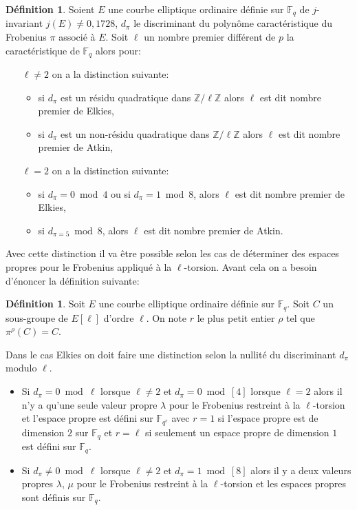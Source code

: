 \documentclass[10pt,a4paper]{book}
\theoremstyle{plain}
\theoremstyle{definition}
\theoremstyle{definition}
\theoremstyle{definition}
\theoremstyle{definition}
\newtheorem{defi}[thm]{Définition}
\theoremstyle{remark}
\theoremstyle{remark}
\theoremstyle{definition}
\begin{document}
\begin{defi}\label{def:dif-Atk-Elk}
Soient $E$ une courbe elliptique ordinaire définie sur $\mathbb{F}_q$ de $j$-invariant $j(E) \neq 0,1728$, $d_{\pi}$ le discriminant du polynôme caractéristique du Frobenius $\pi$ associé à $E$. Soit $\ell$ un nombre premier différent de $p$ la caractéristique de $\mathbb{F}_q$ alors pour:
\begin{itemize}
\item[$\ell \neq 2$] on a la distinction suivante: 

\begin{itemize}
\item si $d_{\pi}$ est un résidu quadratique dans $\mathbb{Z}/\ell \mathbb{Z}$ alors $\ell$ est dit nombre premier de Elkies,
\item si $d_{\pi}$ est un non-résidu quadratique dans $\mathbb{Z}/\ell \mathbb{Z}$ alors $\ell$ est dit nombre premier de Atkin,
\end{itemize} 

\item[$\ell=2$] on a la distinction suivante:
\begin{itemize}
\item si $d_{\pi}= 0 \bmod 4$ ou si $d_{\pi}= 1 \bmod 8$, alors $\ell$ est dit nombre premier de Elkies,
\item si $d_{\pi=5} \bmod 8$, alors $\ell$ est dit nombre premier de Atkin.
\end{itemize}
\end{itemize}
\end{defi}
	Avec cette distinction il va être possible selon les cas de déterminer des espaces propres pour le Frobenius appliqué à la $\ell$-torsion. Avant cela on a besoin d'énoncer la définition suivante:
\begin{defi}
Soit $E$ une courbe elliptique ordinaire définie sur $\mathbb{F}_q$. Soit $C$ un sous-groupe de $E[\ell]$ d'ordre $\ell$. On note $r$ le plus petit entier $\rho$ tel que $\pi^{\rho}(C)=C$.
\end{defi}	
	 
	Dans le cas Elkies on doit faire une distinction selon la nullité du discriminant $d_{\pi}$ modulo $\ell$. 
\begin{itemize}	
	\item Si $d_{\pi}=0 \bmod \ell$ lorsque $\ell \neq 2$ et $d_{\pi}=0 \bmod [4]$ lorsque $\ell=2$  alors il n'y a qu'une seule valeur propre $\lambda$ pour le Frobenius restreint à la $\ell$-torsion  et l'espace propre est défini sur $\mathbb{F}_{q^r}$ avec $r=1$ si l'espace propre est de dimension $2$ sur $\mathbb{F}_q$ et $r=\ell$ si seulement un espace propre de dimension $1$ est défini sur $\mathbb{F}_q$.
	\item Si $d_{\pi} \neq 0 \bmod \ell$ lorsque $\ell \neq 2$ et $d_{\pi}=1 \bmod [8]$ alors il y a deux valeurs propres $\lambda$, $\mu$ pour le Frobenius restreint à la $\ell$-torsion  et les espaces propres sont définis sur $\mathbb{F}_q$.
\end{itemize}
\end{document}
